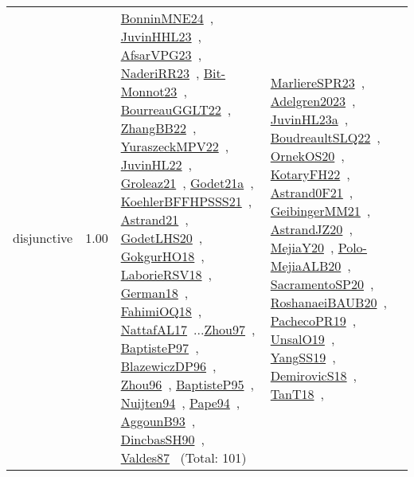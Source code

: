 {\begin{longtable}{p{3cm}r>{\raggedright\arraybackslash}p{6cm}>{\raggedright\arraybackslash}p{6cm}>{\raggedright\arraybackslash}p{8cm}}
\index{disjunctive}\index{Constraints!disjunctive}disjunctive &  1.00 & \href{../works/BonninMNE24.pdf}{BonninMNE24}~\cite{BonninMNE24}, \href{../works/JuvinHHL23.pdf}{JuvinHHL23}~\cite{JuvinHHL23}, \href{../works/AfsarVPG23.pdf}{AfsarVPG23}~\cite{AfsarVPG23}, \href{../works/NaderiRR23.pdf}{NaderiRR23}~\cite{NaderiRR23}, \href{../works/Bit-Monnot23.pdf}{Bit-Monnot23}~\cite{Bit-Monnot23}, \href{../works/BourreauGGLT22.pdf}{BourreauGGLT22}~\cite{BourreauGGLT22}, \href{../works/ZhangBB22.pdf}{ZhangBB22}~\cite{ZhangBB22}, \href{../works/YuraszeckMPV22.pdf}{YuraszeckMPV22}~\cite{YuraszeckMPV22}, \href{../works/JuvinHL22.pdf}{JuvinHL22}~\cite{JuvinHL22}, \href{../works/Groleaz21.pdf}{Groleaz21}~\cite{Groleaz21}, \href{../works/Godet21a.pdf}{Godet21a}~\cite{Godet21a}, \href{../works/KoehlerBFFHPSSS21.pdf}{KoehlerBFFHPSSS21}~\cite{KoehlerBFFHPSSS21}, \href{../works/Astrand21.pdf}{Astrand21}~\cite{Astrand21}, \href{../works/GodetLHS20.pdf}{GodetLHS20}~\cite{GodetLHS20}, \href{../works/GokgurHO18.pdf}{GokgurHO18}~\cite{GokgurHO18}, \href{../works/LaborieRSV18.pdf}{LaborieRSV18}~\cite{LaborieRSV18}, \href{../works/German18.pdf}{German18}~\cite{German18}, \href{../works/FahimiOQ18.pdf}{FahimiOQ18}~\cite{FahimiOQ18}, \href{../works/NattafAL17.pdf}{NattafAL17}~\cite{NattafAL17}...\href{../works/Zhou97.pdf}{Zhou97}~\cite{Zhou97}, \href{../works/BaptisteP97.pdf}{BaptisteP97}~\cite{BaptisteP97}, \href{../works/BlazewiczDP96.pdf}{BlazewiczDP96}~\cite{BlazewiczDP96}, \href{../works/Zhou96.pdf}{Zhou96}~\cite{Zhou96}, \href{../works/BaptisteP95.pdf}{BaptisteP95}~\cite{BaptisteP95}, \href{../works/Nuijten94.pdf}{Nuijten94}~\cite{Nuijten94}, \href{../works/Pape94.pdf}{Pape94}~\cite{Pape94}, \href{../works/AggounB93.pdf}{AggounB93}~\cite{AggounB93}, \href{../works/DincbasSH90.pdf}{DincbasSH90}~\cite{DincbasSH90}, \href{../works/Valdes87.pdf}{Valdes87}~\cite{Valdes87} (Total: 101) & \href{../works/MarliereSPR23.pdf}{MarliereSPR23}~\cite{MarliereSPR23}, \href{../works/Adelgren2023.pdf}{Adelgren2023}~\cite{Adelgren2023}, \href{../works/JuvinHL23a.pdf}{JuvinHL23a}~\cite{JuvinHL23a}, \href{../works/BoudreaultSLQ22.pdf}{BoudreaultSLQ22}~\cite{BoudreaultSLQ22}, \href{../works/OrnekOS20.pdf}{OrnekOS20}~\cite{OrnekOS20}, \href{../works/KotaryFH22.pdf}{KotaryFH22}~\cite{KotaryFH22}, \href{../works/Astrand0F21.pdf}{Astrand0F21}~\cite{Astrand0F21}, \href{../works/GeibingerMM21.pdf}{GeibingerMM21}~\cite{GeibingerMM21}, \href{../works/AstrandJZ20.pdf}{AstrandJZ20}~\cite{AstrandJZ20}, \href{../works/MejiaY20.pdf}{MejiaY20}~\cite{MejiaY20}, \href{../works/Polo-MejiaALB20.pdf}{Polo-MejiaALB20}~\cite{Polo-MejiaALB20}, \href{../works/SacramentoSP20.pdf}{SacramentoSP20}~\cite{SacramentoSP20}, \href{../works/RoshanaeiBAUB20.pdf}{RoshanaeiBAUB20}~\cite{RoshanaeiBAUB20}, \href{../works/PachecoPR19.pdf}{PachecoPR19}~\cite{PachecoPR19}, \href{../works/UnsalO19.pdf}{UnsalO19}~\cite{UnsalO19}, \href{../works/YangSS19.pdf}{YangSS19}~\cite{YangSS19}, \href{../works/DemirovicS18.pdf}{DemirovicS18}~\cite{DemirovicS18}, \href{../works/TanT18.pdf}{TanT18}~\cite{TanT18}, 
\end{longtable}}
